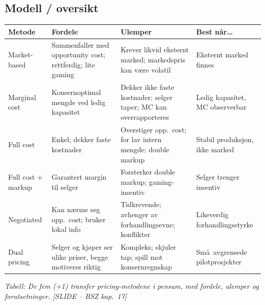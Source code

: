 \subsection*{Modell / oversikt}

\begin{center}
\renewcommand{\arraystretch}{1.2}
\begin{tabular}{@{}p{3.4cm}p{4.6cm}p{4.6cm}p{2.0cm}@{}}
\toprule
\textbf{Metode} & \textbf{Fordele} & \textbf{Ulemper} & \textbf{Best n\aa r\dots} \\
\midrule
Market-based & Sammenfaller med opportunity cost; rettferdig; lite gaming & Krever likvid eksternt marked; markedspris kan v\ae re volatil & Eksternt marked finnes \\
Marginal cost & Konsernoptimal mengde ved ledig kapasitet & Dekker ikke faste kostnader; selger taper; MC kan overrapporteres & Ledig kapasitet, MC observerbar \\
Full cost & Enkel; dekker faste kostnader & Overstiger opp.\ cost; for lav intern mengde; double markup & Stabil produksjon, ikke marked \\
Full cost + markup & Garantert margin til selger & Forsterker double markup; gaming-insentiv & Selger trenger insentiv \\
Negotiated & Kan n\ae rme seg opp.\ cost; bruker lokal info & Tidkrevende; avhenger av forhandlingsevne; konflikter & Likeverdig forhandlingsstyrke \\
Dual pricing & Selger og kj\o per ser ulike priser, begge motiveres riktig & Kompleks; skjuler tap; spill mot konsernregnskap & Sm\aa\ avgrensede pilot\-prosjekter \\
\bottomrule
\end{tabular}
\end{center}
\textit{Tabell: De fem (+1) transfer pricing-metodene i pensum, med fordele, ulemper og forutsetninger. [SLIDE -- BSZ kap.\ 17]}


